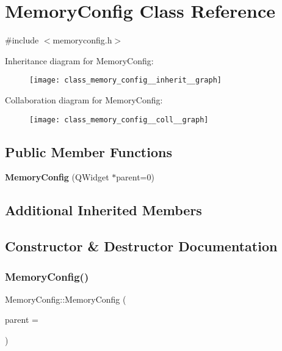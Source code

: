 \section{Memory\+Config Class Reference}
\label{class_memory_config}


{\ttfamily \#include $<$memoryconfig.\+h$>$}



Inheritance diagram for Memory\+Config\+:\nopagebreak
\begin{figure}[H]
\begin{center}
\leavevmode
\texttt{[image: class\_memory\_config\_\_inherit\_\_graph]}
\end{center}
\end{figure}


Collaboration diagram for Memory\+Config\+:\nopagebreak
\begin{figure}[H]
\begin{center}
\leavevmode
\texttt{[image: class\_memory\_config\_\_coll\_\_graph]}
\end{center}
\end{figure}
\subsection*{Public Member Functions}
\begin{DoxyCompactItemize}
\item 
\textbf{ Memory\+Config} (Q\+Widget $\ast$parent=0)
\end{DoxyCompactItemize}
\subsection*{Additional Inherited Members}


\subsection{Constructor \& Destructor Documentation}
\mbox{\label{class_memory_config_a3ae65268c623f5596fcef230cdc5340a}} 
\subsubsection{Memory\+Config()}
{\footnotesize\ttfamily Memory\+Config\+::\+Memory\+Config (\begin{DoxyParamCaption}\item[{Q\+Widget $\ast$}]{parent = {} }\end{DoxyParamCaption})}

